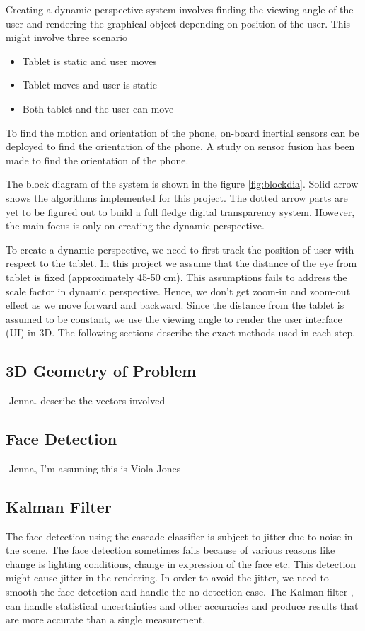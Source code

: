 \documentclass[12pt,twocolumn,letterpaper]{article}
\begin{document}
Creating a dynamic perspective system involves finding the viewing angle of the user and rendering the graphical object depending on position of the user. This might involve three scenario
\begin{itemize}
\item Tablet is static and user moves
\item Tablet moves and user is static
\item Both tablet and the user can move
\end{itemize}

To find the motion and orientation of the phone, on-board inertial sensors can be deployed to find the orientation of the phone. A study on sensor fusion has been made to find the orientation of the phone.

The block diagram of the system is shown in the figure  \ref{fig:blockdia}. Solid arrow shows the algorithms implemented for this project. The dotted arrow parts are yet to be figured out to build a full fledge digital transparency system. However, the main focus is only on creating the dynamic perspective.

To create a dynamic perspective, we need to first track the position of user with respect to the tablet. In this project we assume that the distance of the eye from tablet is fixed (approximately 45-50 cm). This assumptions fails to address the scale factor in dynamic perspective. Hence, we don't get zoom-in and zoom-out effect as we move forward and backward. Since the distance from the tablet is assumed to be constant, we use the viewing angle to render the user interface (UI) in 3D. The following sections describe the exact methods used in each step.

\subsection{3D Geometry of Problem}
    -Jenna. describe the vectors involved
\subsection{Face Detection}
    -Jenna, I'm assuming this is Viola-Jones

\subsection{Kalman Filter}
The face detection using the cascade classifier is subject to jitter due to noise in the scene. The face detection sometimes fails because of various reasons like change is lighting conditions, change in expression of the face etc. This detection might cause jitter in the rendering. In order to avoid the jitter, we need to smooth the face detection and handle the no-detection case. The Kalman filter \cite{kalman}, can handle statistical uncertainties and other accuracies and produce results that are more accurate than a single measurement.
\end{document}
